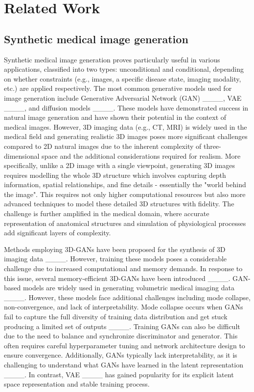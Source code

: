\section{Related Work}
\subsection{Synthetic medical image generation}
Synthetic medical image generation proves particularly useful in various applications, classified into two types: unconditional and conditional, depending on whether constraints (e.g., images, a specific disease state, imaging modality, etc.) are applied respectively. The most common generative models used for image generation include Generative Adversarial Network (GAN) ____, VAE ____, and diffusion models ____. These models have demonstrated success in natural image generation and have shown their potential in the context of medical images. However, 3D imaging data (e.g., CT, MRI) is widely used in the medical field and generating realistic 3D images poses more significant challenges compared to 2D natural images due to the inherent complexity of three-dimensional space and the additional considerations required for realism. More specifically, unlike a 2D image with a single viewpoint, generating 3D images requires modelling the whole 3D structure which involves capturing depth information, spatial relationships, and fine details - essentially the "world behind the image". This requires not only higher computational resources but also more advanced techniques to model these detailed 3D structures with fidelity. The challenge is further amplified in the medical domain, where accurate representation of anatomical structures and simulation of physiological processes add significant layers of complexity.

Methods employing 3D-GANs have been proposed for the synthesis of 3D imaging data ____. However, training these models poses a considerable challenge due to increased computational and memory demands. In response to this issue, several memory-efficient 3D-GANs have been introduced ____. GAN-based models are widely used in generating volumetric medical imaging data ____. However, these models face additional challenges including mode collapse, non-convergence, and lack of interpretability. Mode collapse occurs when GANs fail to capture the full diversity of training data distribution and get stuck producing a limited set of outputs ____. Training GANs can also be difficult due to the need to balance and synchronize discriminator and generator. This often requires careful hyperparameter tuning and network architecture design to ensure convergence. Additionally, GANs typically lack interpretability, as it is challenging to understand what GANs have learned in the latent representation ____. In contrast, VAE ____ has gained popularity for its explicit latent space representation and stable training process.

